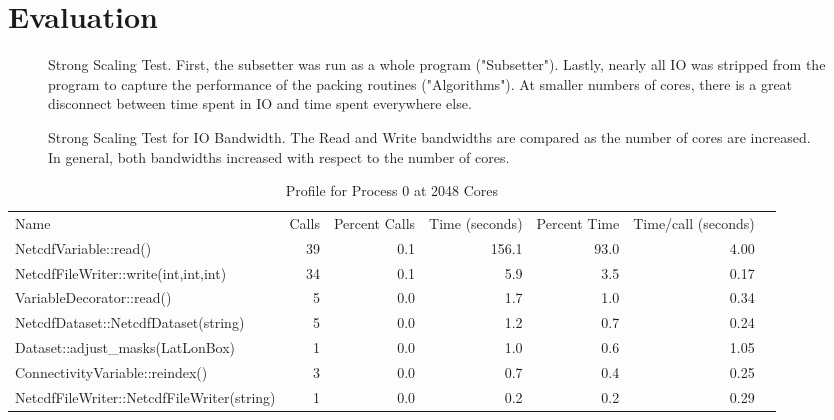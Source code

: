 \section{Evaluation}
\label{section:evaluation}

\begin{figure}[!t]
\center
\resizebox{3.5in}{!}{

}
\caption{Strong Scaling Test.  First, the subsetter was run as a whole
program ("Subsetter").  Lastly, nearly all IO was stripped from the program
to capture the performance of the packing routines ("Algorithms").  At smaller
numbers of cores, there is a great disconnect between time spent in IO and
time spent everywhere else.}
\label{fig:strong}
\end{figure}

\begin{figure}[!t]
\center
\resizebox{3.5in}{!}{

}
\caption{Strong Scaling Test for IO Bandwidth.  The Read and Write bandwidths
are compared as the number of cores are increased.  In general, both
bandwidths increased with respect to the number of cores.}
\label{fig:strong_io}
\end{figure}

\begin{table*}[!t]
\center
\caption{Profile for Process 0 at 2048 Cores}
\label{tab:strong_prof}
\begin{tabular}{lrrrrrr}
Name&Calls&Percent Calls&Time (seconds)&Percent Time&Time/call (seconds)\\
NetcdfVariable::read()                    &39&0.1&156.1&93.0&4.00\\
NetcdfFileWriter::write(int,int,int)      &34&0.1&  5.9& 3.5&0.17\\
VariableDecorator::read()                 & 5&0.0&  1.7& 1.0&0.34\\
NetcdfDataset::NetcdfDataset(string)      & 5&0.0&  1.2& 0.7&0.24\\
Dataset::adjust\_masks(LatLonBox)         & 1&0.0&  1.0& 0.6&1.05\\
ConnectivityVariable::reindex()           & 3&0.0&  0.7& 0.4&0.25\\
NetcdfFileWriter::NetcdfFileWriter(string)& 1&0.0&  0.2& 0.2&0.29\\
\end{tabular}
\end{table*}

